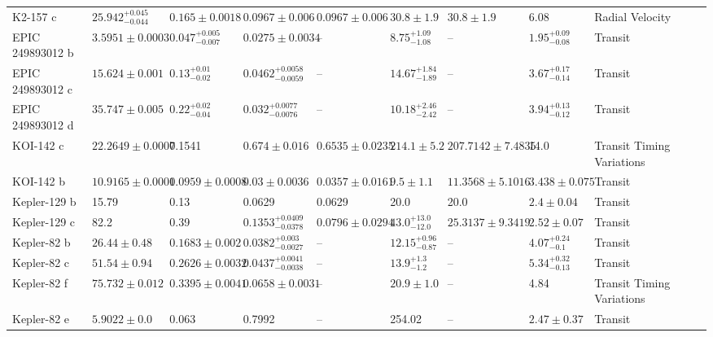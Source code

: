 \begin{tabular}{llllllllll}
K2-157 c & $25.942^{+0.045}_{-0.044}$ & $0.165 \pm 0.0018$ & $0.0967 \pm 0.006$ & $0.0967 \pm 0.006$ & $30.8 \pm 1.9$ & $30.8 \pm 1.9$ & 6.08 & Radial Velocity & \cite{CASTRO_GONZALEZ_ET_AL_2025} \\
EPIC 249893012 b & $3.5951 \pm 0.0003$ & $0.047^{+0.005}_{-0.007}$ & $0.0275 \pm 0.0034$ & -- & $8.75^{+1.09}_{-1.08}$ & -- & $1.95^{+0.09}_{-0.08}$ & Transit & \cite{HIDALGO_ET_AL__2020} \\
EPIC 249893012 c & $15.624 \pm 0.001$ & $0.13^{+0.01}_{-0.02}$ & $0.0462^{+0.0058}_{-0.0059}$ & -- & $14.67^{+1.84}_{-1.89}$ & -- & $3.67^{+0.17}_{-0.14}$ & Transit & \cite{HIDALGO_ET_AL__2020} \\
EPIC 249893012 d & $35.747 \pm 0.005$ & $0.22^{+0.02}_{-0.04}$ & $0.032^{+0.0077}_{-0.0076}$ & -- & $10.18^{+2.46}_{-2.42}$ & -- & $3.94^{+0.13}_{-0.12}$ & Transit & \cite{HIDALGO_ET_AL__2020} \\
KOI-142 c & $22.2649 \pm 0.0007$ & 0.1541 & $0.674 \pm 0.016$ & $0.6535 \pm 0.0235$ & $214.1 \pm 5.2$ & $207.7142 \pm 7.4835$ & 14.0 & Transit Timing Variations & \cite{WEISS_ET_AL__2020} \\
KOI-142 b & $10.9165 \pm 0.0001$ & $0.0959 \pm 0.0008$ & $0.03 \pm 0.0036$ & $0.0357 \pm 0.0161$ & $9.5 \pm 1.1$ & $11.3568 \pm 5.1016$ & $3.438 \pm 0.075$ & Transit & \cite{WEISS_ET_AL__2020} \\
Kepler-129 b & 15.79 & 0.13 & 0.0629 & 0.0629 & 20.0 & 20.0 & $2.4 \pm 0.04$ & Transit & \cite{ZHANG_ET_AL__2021} \\
Kepler-129 c & 82.2 & 0.39 & $0.1353^{+0.0409}_{-0.0378}$ & $0.0796 \pm 0.0294$ & $43.0^{+13.0}_{-12.0}$ & $25.3137 \pm 9.3419$ & $2.52 \pm 0.07$ & Transit & \cite{ZHANG_ET_AL__2021} \\
Kepler-82 b & $26.44 \pm 0.48$ & $0.1683 \pm 0.002$ & $0.0382^{+0.003}_{-0.0027}$ & -- & $12.15^{+0.96}_{-0.87}$ & -- & $4.07^{+0.24}_{-0.1}$ & Transit & \cite{FREUDENTHAL_ET_AL__2019} \\
Kepler-82 c & $51.54 \pm 0.94$ & $0.2626 \pm 0.0032$ & $0.0437^{+0.0041}_{-0.0038}$ & -- & $13.9^{+1.3}_{-1.2}$ & -- & $5.34^{+0.32}_{-0.13}$ & Transit & \cite{FREUDENTHAL_ET_AL__2019} \\
Kepler-82 f & $75.732 \pm 0.012$ & $0.3395 \pm 0.0041$ & $0.0658 \pm 0.0031$ & -- & $20.9 \pm 1.0$ & -- & 4.84 & Transit Timing Variations & \cite{FREUDENTHAL_ET_AL__2019} \\
Kepler-82 e & $5.9022 \pm 0.0$ & 0.063 & 0.7992 & -- & 254.02 & -- & $2.47 \pm 0.37$ & Transit & \cite{ROWE_ET_AL__2014} \\
\bottomrule
\end{tabular}
